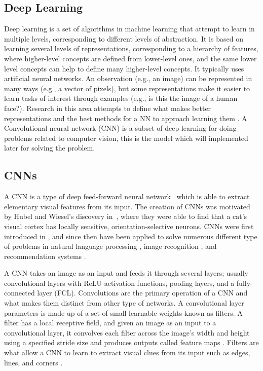 \subsection{Deep Learning}
Deep learning is a set of algorithms in machine learning that attempt to learn in multiple levels, corresponding to different levels of abstraction. It is based on learning several levels of representations, corresponding to a hierarchy of features, where higher-level concepts are defined from lower-level ones, and the same lower level concepts can help to define many higher-level concepts. It typically uses artificial neural networks. An observation (e.g., an image) can be represented in many ways (e.g., a vector of pixels), but some representations make it easier to learn tasks of interest through examples (e.g., is this the image of a human face?). Research in this area attempts to define what makes better representations and the best methods for a NN to approach learning them \cite{DeepLearning}. A Convolutional neural network (CNN) is a subset of deep learning for doing problems related to computer vision, this is the model which will implemented later for solving the problem.

\subsection{CNNs}

A CNN is a type of deep feed-forward neural network~\cite{cnn-star-galaxy} which is able to extract elementary visual features from its input. The creation of CNNs was motivated by Hubel and Wiesel's discovery in~\cite{hubel-wiesel-receptive-fields}, where they were able to find that a cat's visual cortex has locally sensitive, orientation-selective neurons. CNNs were first introduced in \citeyear{Lecun99objectrecognition} \cite{Lecun99objectrecognition}, and since then have been applied to solve numerous different type of problems in  natural language processing \cite{Collobert:2008:UAN:1390156.1390177}, image recognition \cite{cnn-star-galaxy}, and recommendation systems \cite{NIPS2013_5004}.

A CNN takes an image as an input and feeds it through several layers; usually convolutional layers with ReLU activation functions, pooling layers, and a fully-connected layer (FCL). Convolutions are the primary operation of a CNN and what makes them distinct from other type of networks. A convolutional layer parameters is made up of a set of small learnable weights known as filters. A filter has a local receptive field, and given an image as an input to a convolutional layer, it convolves each filter across the image's width and height using a specified stride size and produces outputs called feature maps \cite{cnn-star-galaxy}. Filters are what allow a CNN to learn to extract visual clues from its input such as edges, lines, and corners \cite{Lecun99objectrecognition}.

